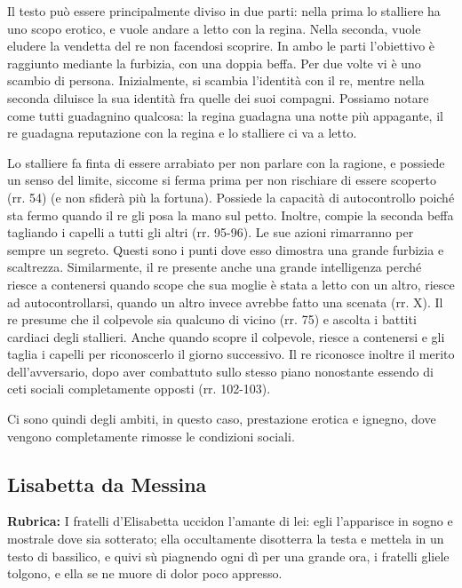 \documentclass[a4paper]{article}
\begin{document}
Il testo può essere principalmente diviso in due parti: nella prima lo stalliere
ha uno scopo erotico, e vuole andare a letto con la regina. Nella seconda,
vuole eludere la vendetta del re non facendosi scoprire.
In ambo le parti l'obiettivo è raggiunto mediante la furbizia, con una doppia beffa.
Per due volte vi è uno scambio di persona. Inizialmente, si scambia l'identità con il re, mentre
nella seconda diluisce la sua identità fra quelle dei suoi compagni.
Possiamo notare come tutti guadagnino qualcosa: la regina guadagna una notte più appagante,
il re guadagna reputazione con la regina e lo stalliere ci va a letto.

Lo stalliere fa finta di essere arrabiato per non parlare con la ragione, e
possiede un senso del limite, siccome si ferma prima per non rischiare di essere scoperto (rr. 54) (e non sfiderà più la fortuna).
Possiede la capacità di autocontrollo poiché sta fermo quando il re gli posa la mano
sul petto. Inoltre, compie la seconda beffa tagliando i capelli a tutti gli altri (rr. 95-96).
Le sue azioni rimarranno per sempre un segreto.
Questi sono i punti dove esso dimostra una grande furbizia e scaltrezza.
Similarmente, il re presente anche una grande intelligenza
perché riesce a contenersi quando scope che sua moglie è stata a letto con un altro,
riesce ad autocontrollarsi, quando un altro invece avrebbe fatto una scenata (rr. X).
Il re presume che il colpevole sia qualcuno di vicino (rr. 75) e ascolta i battiti
cardiaci degli stallieri. Anche quando scopre il colpevole, riesce a contenersi e gli taglia
i capelli per riconoscerlo il giorno successivo.
Il re riconosce inoltre il merito dell'avversario, dopo aver combattuto sullo stesso
piano nonostante essendo di ceti sociali completamente opposti (rr. 102-103).

Ci sono quindi degli ambiti, in questo caso, prestazione erotica e ignegno,
dove vengono completamente rimosse le condizioni sociali.

\pagebreak

\subsection{Lisabetta da Messina}

\textbf{Rubrica:} I fratelli d'Elisabetta uccidon
l'amante di lei: egli l'apparisce
in sogno e mostrale dove sia sotterato;
ella occultamente disotterra la testa e mettela in un testo di bassilico,
e quivi sù piagnendo ogni dì per una grande ora, i fratelli gliele tolgono,
e ella se ne muore di dolor poco appresso.
\end{document}
